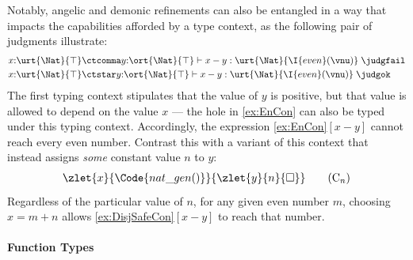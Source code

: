 Notably, angelic and demonic refinements can also be entangled in a
way that impacts the capabilities afforded by a type context, as the
following pair of judgments illustrate:
\begin{align*}
  &x{:}\urt{\Nat}{\top} \ctcomma y{:}\ort{\Nat}{\top} \vdash x - y : \urt{\Nat}{\I{even}(\vnu)} \;\judgfail
  \\&x{:}\urt{\Nat}{\top} \ctstar y{:}\ort{\Nat}{\top} \vdash x - y : \urt{\Nat}{\I{even}(\vnu)} \;\judgok
\end{align*}\noindent
The first typing context stipulates that the value of $y$ is positive,
but that value is allowed to depend on the value $x$ --- the hole in
\ref{ex:EnCon} can also be typed under this typing
context. Accordingly, the expression \ref{ex:EnCon}$[x - y]$ cannot
reach every even number. Contrast this with a variant of this context
that instead assigns \emph{some} constant value $n$ to $y$:
\begin{align}
  &\zlet{x}{\Code{nat\_gen () }}{\zlet{y}{n}{\square}}
    \tag{C$_{n}$}\label{ex:DisjSafeCon} \\
\end{align}
Regardless of the particular value of $n$, for any given even number
$m$, choosing $x = m + n$ allows \ref{ex:DisjSafeCon}$[x - y]$ to
reach that number.


\paragraph{Function Types}

